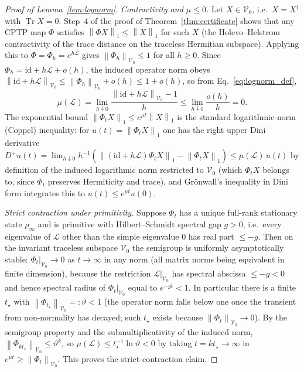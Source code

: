 \documentclass[twocolumn,aps,prxquantum,superscriptaddress,nofootinbib,floatfix,longbibliography]{revtex4-2}
\DeclareMathOperator{\Tr}{Tr}
\newcommand{\calL}{\mathcal{L}}
\newcommand{\id}{\mathrm{id}}
\newcommand{\norm}[1]{\left\lVert #1 \right\rVert}
\begin{document}
\begin{proof}[Proof of Lemma~\ref{lem:lognorm}]
\emph{Contractivity and $\mu\le0$.} Let $X\in\mathcal{V}_0$, i.e.\ $X=X^\dagger$ with $\Tr X=0$. Step~4 of the proof of Theorem~\ref{thm:certificate} shows that any CPTP map $\Phi$ satisfies $\norm{\Phi X}_1\le\norm{X}_1$ for such $X$ (the Holevo--Helstrom contractivity of the trace distance on the traceless Hermitian subspace). Applying this to $\Phi=\Phi_h=e^{h\calL}$ gives $\norm{\Phi_h}_{\mathcal{V}_0}\le1$ for all $h\ge0$. Since $\Phi_h=\id+h\calL+o(h)$, the induced operator norm obeys $\norm{\id+h\calL}_{\mathcal{V}_0}\le\norm{\Phi_h}_{\mathcal{V}_0}+o(h)\le1+o(h)$, so from Eq.~\eqref{eq:lognorm_def},
\[
\mu(\calL)=\lim_{h\downarrow0}\frac{\norm{\id+h\calL}_{\mathcal{V}_0}-1}{h}\le\lim_{h\downarrow0}\frac{o(h)}{h}=0 .
\]
The exponential bound $\norm{\Phi_tX}_1\le e^{\mu t}\norm{X}_1$ is the standard logarithmic-norm (Coppel) inequality: for $u(t)=\norm{\Phi_tX}_1$ one has the right upper Dini derivative $D^+u(t)=\lim_{h\downarrow0}h^{-1}(\norm{(\id+h\calL)\Phi_tX}_1-\norm{\Phi_tX}_1)\le\mu(\calL)\,u(t)$ by definition of the induced logarithmic norm restricted to $\mathcal{V}_0$ (which $\Phi_tX$ belongs to, since $\Phi_t$ preserves Hermiticity and trace), and Gr\"onwall's inequality in Dini form integrates this to $u(t)\le e^{\mu t}u(0)$.

\emph{Strict contraction under primitivity.} Suppose $\Phi_t$ has a unique full-rank stationary state $\rho_\infty$ and is primitive with Hilbert--Schmidt spectral gap $g>0$, i.e.\ every eigenvalue of $\calL$ other than the simple eigenvalue $0$ has real part $\le-g$. Then on the invariant traceless subspace $\mathcal{V}_0$ the semigroup is uniformly asymptotically stable: $\Phi_t|_{\mathcal{V}_0}\to0$ as $t\to\infty$ in any norm (all matrix norms being equivalent in finite dimension), because the restriction $\calL|_{\mathcal{V}_0}$ has spectral abscissa $\le-g<0$ and hence spectral radius of $\Phi_t|_{\mathcal{V}_0}$ equal to $e^{-gt}<1$. In particular there is a finite $t_\star$ with $\norm{\Phi_{t_\star}}_{\mathcal{V}_0}=:\vartheta<1$ (the operator norm falls below one once the transient from non-normality has decayed; such $t_\star$ exists because $\norm{\Phi_t}_{\mathcal{V}_0}\to0$). By the semigroup property and the submultiplicativity of the induced norm, $\norm{\Phi_{kt_\star}}_{\mathcal{V}_0}\le\vartheta^k$, so $\mu(\calL)\le t_\star^{-1}\ln\vartheta<0$ by taking $t=kt_\star\to\infty$ in $e^{\mu t}\ge\norm{\Phi_t}_{\mathcal{V}_0}$. This proves the strict-contraction claim.
\end{proof}
\end{document}
